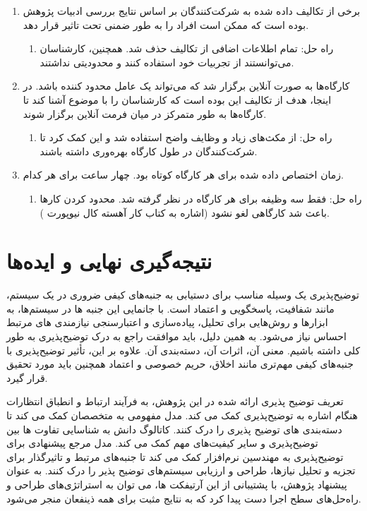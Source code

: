 \begin{enumerate}
    \item برخی از تکالیف داده شده به شرکت‌کنندگان بر اساس نتایج بررسی ادبیات
    پژوهش بوده است که ممکن است افراد را به طور ضمنی تحت تاثیر قرار دهد. 
    \begin{enumerate}
        \item راه حل: تمام اطلاعات اضافی از تکالیف حذف شد. همچنین، کارشناسان
        می‌توانستند از تجربیات خود استفاده کنند و محدودیتی نداشتند.
    \end{enumerate}
    \item کارگاه‌ها به صورت آنلاین برگزار شد که می‌تواند یک عامل محدود‌ کننده
    باشد. در اینجا، هدف از تکالیف این بوده است که کارشناسان را با موضوع آشنا کند
    تا کارگاه‌ها به طور متمرکز در میان فرمت آنلاین برگزار شوند. 
    \begin{enumerate}
        \item راه حل: از مکث‌های زیاد و وظایف واضح استفاده شد و این کمک کرد تا
        شرکت‌کنندگان در طول کارگاه بهره‌وری داشته باشند.
    \end{enumerate}
    \item زمان اختصاص داده شده برای هر کارگاه کوتاه بود. چهار ساعت برای هر کدام.
    \begin{enumerate}
        \item راه حل: فقط سه وظیفه برای هر کارگاه در نظر گرفته شد. محدود کردن
        کارها باعث شد کارگاهی لغو نشود (اشاره به کتاب کار آهسته کال نیوپورت
        \cite{slowProductivity}).
    \end{enumerate}
\end{enumerate}

\section{نتیجه‌گیری نهایی و ایده‌ها}

توضیح‌پذیری یک وسیله مناسب برای دستیابی به جنبه‌های کیفی ضروری در یک سیستم،
مانند شفافیت، پاسخگویی و اعتماد است. با جانمایی این جنبه ها در سیستم‌ها، به
ابزارها و روش‌هایی برای تحلیل، پیاده‌سازی و اعتبارسنجی نیازمندی های مرتبط احساس
نیاز می‌شود. به همین دلیل، باید موافقت راجع به درک توضیح‌پذیری به طور کلی داشته
باشیم. معنی آن، اثرات آن، دسته‌بندی آن. علاوه بر این، تأثیر توضیح‌پذیری با
جنبه‌های کیفی مهم‌تری مانند اخلاق، حریم خصوصی و اعتماد همچنین باید مورد تحقیق
قرار گیرد.

تعریف توضیح پذیری ارائه شده در این پژوهش، به فرآیند ارتباط و انطباق انتظارات
هنگام اشاره به توضیح‌پذیری کمک می کند. مدل مفهومی به متخصصان کمک می کند تا
دسته‌بندی های توضیح پذیری را درک کنند. کاتالوگ دانش به شناسایی تفاوت ها بین
توضیح‌پذیری و سایر کیفیت‌های مهم کمک می کند. مدل مرجع پیشنهادی برای توضیح‌پذیری
به مهندسین نرم‌افزار کمک می کند تا جنبه‌های مرتبط و تاثیرگذار برای تجزیه و تحلیل
نیاز‌ها، طراحی و ارزیابی سیستم‌های توضیح پذیر را درک کنند. به عنوان پیشنهاد
پژوهش، با پشتیبانی از این آرتیفکت ها، می توان به استراتژی‌های طراحی و راه‌حل‌های
سطح اجرا دست پیدا کرد که به نتایج مثبت برای همه ذینفعان منجر می‌شود. 